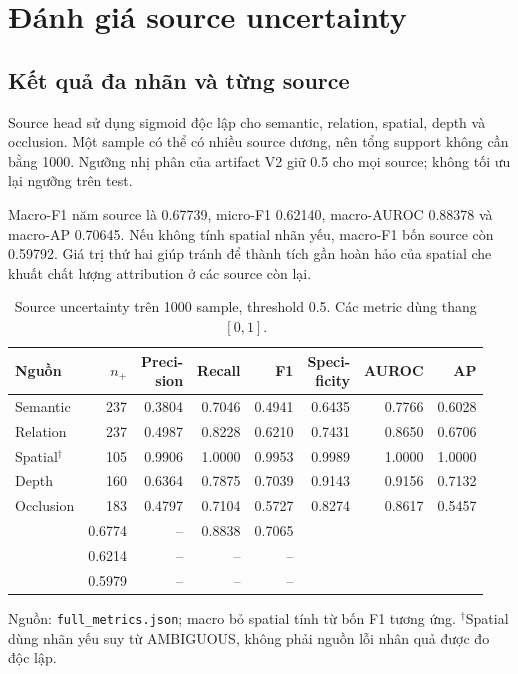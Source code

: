 \section{Đánh giá source uncertainty}
\label{sec:results-source}

\subsection{Kết quả đa nhãn và từng source}

Source head sử dụng sigmoid độc lập cho semantic,
relation, spatial, depth và occlusion. Một sample có
thể có nhiều source dương, nên tổng support không
cần bằng 1000. Ngưỡng nhị phân của artifact V2 giữ
0.5 cho mọi source; không tối ưu lại ngưỡng trên test.

Macro-F1 năm source là 0.67739, micro-F1 0.62140,
macro-AUROC 0.88378 và macro-AP 0.70645.
Nếu không tính spatial nhãn yếu, macro-F1 bốn
source còn 0.59792. Giá trị thứ hai giúp tránh
để thành tích gần hoàn hảo của spatial che khuất
chất lượng attribution ở các source còn lại.

\begin{table}[htbp]
    \centering
    \setlength{\tabcolsep}{4pt}
    \renewcommand{\arraystretch}{1.15}
    \caption{Source uncertainty trên 1000 sample,
    threshold 0.5. Các metric dùng thang $[0,1]$.}
    \label{tab:results-source-main}
    \small
    \begin{tabularx}{\textwidth}{@{}>{\raggedright\arraybackslash}Xrrrrrrr@{}}
        \toprule
        Nguồn & $n_+$ & \shortstack{Preci-\\sion} & Recall & F1 & \shortstack{Speci-\\ficity} & AUROC & AP \\
        \midrule
        Semantic & 237 & 0.3804 & 0.7046 & 0.4941 & 0.6435 & 0.7766 & 0.6028 \\
        Relation & 237 & 0.4987 & 0.8228 & 0.6210 & 0.7431 & 0.8650 & 0.6706 \\
        Spatial$^\dagger$ & 105 & 0.9906 & 1.0000 & 0.9953 & 0.9989 & 1.0000 & 1.0000 \\
        Depth & 160 & 0.6364 & 0.7875 & 0.7039 & 0.9143 & 0.9156 & 0.7132 \\
        Occlusion & 183 & 0.4797 & 0.7104 & 0.5727 & 0.8274 & 0.8617 & 0.5457 \\
        \midrule
        \multicolumn{4}{@{}l}{Macro, 5 nguồn} & 0.6774 & -- & 0.8838 & 0.7065 \\
        \multicolumn{4}{@{}l}{Micro-F1, 5 nguồn} & 0.6214 & -- & -- & -- \\
        \multicolumn{4}{@{}l}{Macro-F1, bỏ spatial} & 0.5979 & -- & -- & -- \\
        \bottomrule
    \end{tabularx}
    \vspace{2pt}
    {\footnotesize\raggedright Nguồn: \texttt{full\_\allowbreak metrics.json};
    macro bỏ spatial tính từ bốn F1 tương ứng.
    $^\dagger$Spatial dùng nhãn yếu suy từ AMBIGUOUS,
    không phải nguồn lỗi nhân quả được đo độc lập.\par}
\end{table}

